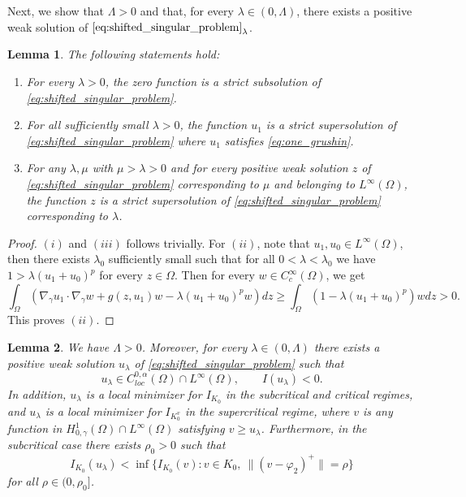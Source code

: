 \documentclass[11pt]{article}
\newtheorem{lemma}{Lemma}[section] %
\newcommand{\al} {\alpha}
\newcommand{\om} {\Omega}
\newcommand{\la} {\lambda}
\newcommand{\gradgr}{\nabla_{\gamma}}
\newcommand{\spacegr}{H^{1}_{0,\gamma}(\Omega)}
\begin{document}
Next, we show that $\Lambda>0$ and that, for every $\lambda \in (0,\Lambda)$, there exists a positive weak solution of $\eqref{eq:shifted_singular_problem}_{\lambda}$.

\begin{lemma}
The following statements hold:
\begin{enumerate}
  \item[(i)] For every $\lambda > 0$, the zero function is a strict subsolution of \eqref{eq:shifted_singular_problem}.
  
  \item[(ii)] For all sufficiently small $\lambda > 0$, the function $u_1$ is a strict supersolution of \eqref{eq:shifted_singular_problem} where $u_1$ satisfies \eqref{eq:one_grushin}.
  
  \item[(iii)] For any $\lambda, \mu$ with $\mu > \lambda > 0$ and for every positive weak solution $z$ of \eqref{eq:shifted_singular_problem} corresponding to $\mu$ and belonging to $L^{\infty}(\Omega)$, the function $z$ is a strict supersolution of \eqref{eq:shifted_singular_problem} corresponding to $\lambda$.
\end{enumerate}
\end{lemma}
\begin{proof}
$(i)$ and $(iii)$ follows trivially. For $(ii)$, note that $u_1, u_{0} \in L^{\infty}(\om)$, then there exists $\la_0$ sufficiently small such that for all $0 < \la < \la_0$ we have $1 > \la (u_1 + u_{0})^p$ for every $z \in \om$. Then for every $w \in C_c^{\infty}(\om)$, we get
\begin{equation*}
    \int_{\om} ( \gradgr u_1 \cdot \gradgr w + g(z,u_1)w - \la (u_1 + u_{0})^pw)dz \geq \int_{\om} (1- \la(u_1 + u_{0})^p)w dz > 0.
\end{equation*}
This proves $(ii)$.
\end{proof}

\begin{lemma}\label{lem:existence_critical_firstsoln}
We have $\Lambda>0$. Moreover, for every $\lambda\in(0,\Lambda)$ there exists a positive weak solution $u_\lambda$ of \eqref{eq:shifted_singular_problem} such that
\[
u_\lambda \in C_{loc}^{0,\al}(\Omega)\cap L^\infty(\Omega), \qquad I(u_\lambda)<0.
\]
In addition, $u_\lambda$ is a local minimizer for $I_{K_0}$ in the subcritical and critical regimes, and $u_\lambda$ is a local minimizer for $I_{K_0^v}$ in the supercritical regime, where $v$ is any function in $\spacegr\cap L^\infty(\Omega)$ satisfying $v\ge u_\lambda$. Furthermore, in the subcritical case there exists $\rho_0>0$ such that
\begin{equation*}
I_{K_0}(u_\lambda) < \inf\bigl\{ I_{K_0}(v) : v\in K_0,\ \|(v-\varphi_2)^+\| = \rho \bigr\}
\end{equation*}
for all $\rho\in(0,\rho_0]$.
\end{lemma}
\end{document}
